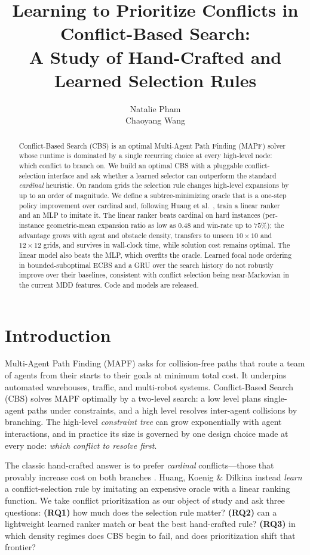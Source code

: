 \documentclass{article}
\title{Learning to Prioritize Conflicts in Conflict-Based Search:\\
A Study of Hand-Crafted and Learned Selection Rules}
\author{%
  Natalie Pham \\
  \And
  Chaoyang Wang
}
\theoremstyle{plain}
\theoremstyle{definition}
\theoremstyle{remark}
\begin{document}
\maketitle
\begin{abstract}
Conflict-Based Search (CBS) is an optimal Multi-Agent Path Finding (MAPF) solver
whose runtime is dominated by a single recurring choice at every high-level node:
which conflict to branch on. We build an optimal CBS with a pluggable
conflict-selection interface and ask whether a learned selector can outperform
the standard \emph{cardinal} heuristic. On random grids the selection rule
changes high-level expansions by up to an order of magnitude. We define a
subtree-minimizing oracle that is a one-step policy improvement over cardinal
and, following Huang et al.\ \cite{Huang2020resolveconflictsforMAPF}, train a
linear ranker and an MLP to imitate it. The linear ranker beats cardinal on hard
instances (per-instance geometric-mean expansion ratio as low as $0.48$ and
win-rate up to $75\%$); the advantage grows with agent and obstacle density,
transfers to unseen $10\times10$ and $12\times12$ grids, and survives in
wall-clock time, while solution cost remains optimal. The linear model also
beats the MLP, which overfits the oracle. Learned focal node ordering in
bounded-suboptimal ECBS and a GRU over the search history do not robustly
improve over their baselines, consistent with conflict selection being
near-Markovian in the current MDD features. Code and models are released.
\end{abstract}
\vspace{-18pt}
\section{Introduction}
\vspace{-8pt}
Multi-Agent Path Finding (MAPF) asks for collision-free paths that route a team
of agents from their starts to their goals at minimum total cost. It underpins
automated warehouses, traffic, and multi-robot systems. Conflict-Based Search
(CBS) \cite{sharon2015conflict} solves MAPF optimally by a two-level search: a
low level plans single-agent paths under constraints, and a high level resolves
inter-agent collisions by branching. The high-level \emph{constraint tree} can
grow exponentially with agent interactions, and in practice its size is governed
by one design choice made at every node: \emph{which conflict to resolve first}.

The classic hand-crafted answer is to prefer \emph{cardinal} conflicts---those
that provably increase cost on both branches \cite{boyarski2015icbs}. Huang,
Koenig \& Dilkina \cite{Huang2020resolveconflictsforMAPF} instead \emph{learn} a
conflict-selection rule by imitating an expensive oracle with a linear ranking
function. We take conflict prioritization as our object of study and ask three
questions: \textbf{(RQ1)} how much does the selection rule matter?
\textbf{(RQ2)} can a lightweight learned ranker match or beat the best
hand-crafted rule? \textbf{(RQ3)} in which density regimes does CBS begin to
fail, and does prioritization shift that frontier?
\end{document}
